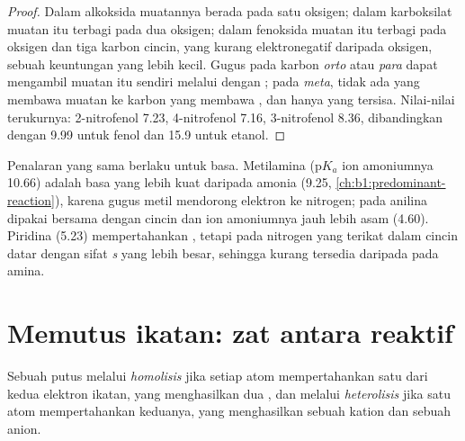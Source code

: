 \begin{proof}
Dalam alkoksida muatannya berada pada satu oksigen; dalam karboksilat
muatan itu terbagi pada dua oksigen; dalam fenoksida muatan itu terbagi
pada oksigen dan tiga karbon cincin, yang kurang elektronegatif daripada
oksigen, sebuah keuntungan yang lebih kecil. Gugus  pada karbon
\textit{orto} atau \textit{para} dapat mengambil muatan itu sendiri
melalui  dengan ; pada
\textit{meta}, tidak ada  yang membawa muatan ke karbon
yang membawa , dan hanya  yang tersisa. Nilai-nilai
terukurnya: 2-nitrofenol 7.23, 4-nitrofenol 7.16, 3-nitrofenol 8.36,
dibandingkan dengan 9.99 untuk fenol dan 15.9 untuk etanol.
\end{proof}

Penalaran yang sama berlaku untuk basa. Metilamina ($\mathrm{p}K_a$ ion
amoniumnya 10.66) adalah basa yang lebih kuat daripada amonia (9.25,
\cref{ch:b1:predominant-reaction}), karena gugus metil mendorong elektron
ke nitrogen; pada anilina  dipakai bersama
dengan cincin dan ion amoniumnya jauh lebih asam (4.60). Piridina (5.23)
mempertahankan , tetapi pada nitrogen yang
terikat dalam cincin datar dengan sifat \textit{s} yang lebih besar,
sehingga kurang tersedia daripada pada amina.

\section{Memutus ikatan: zat antara reaktif}

\begin{definition}\label{def:b1:electronic-effects:cleavage}
Sebuah  putus melalui \emph{homolisis}
jika setiap atom mempertahankan satu dari kedua elektron ikatan, yang
menghasilkan dua , dan melalui
\emph{heterolisis} jika satu atom mempertahankan
keduanya, yang menghasilkan sebuah kation dan sebuah anion.
\end{definition}

